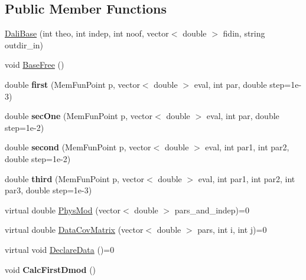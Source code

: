 \subsection*{Public Member Functions}
\begin{DoxyCompactItemize}
\item 
\hyperlink{classDaliBase_a7ea85e708de3877d9a771d93ea76d617}{Dali\-Base} (int theo, int indep, int noof, vector$<$ double $>$ fidin, string outdir\-\_\-in)
\item 
void \hyperlink{classDaliBase_af6a34db604769e09853e8300dc17fd7c}{Base\-Free} ()
\item 
\hypertarget{classDaliBase_a07d372be1ae30d25a7fd5444042585c4}{double {\bfseries first} (Mem\-Fun\-Point p, vector$<$ double $>$ eval, int par, double step=1e-\/3)}\label{classDaliBase_a07d372be1ae30d25a7fd5444042585c4}

\item 
\hypertarget{classDaliBase_a546624effef5b36ffc555ad13de1709b}{double {\bfseries sec\-One} (Mem\-Fun\-Point p, vector$<$ double $>$ eval, int par, double step=1e-\/2)}\label{classDaliBase_a546624effef5b36ffc555ad13de1709b}

\item 
\hypertarget{classDaliBase_a23a77b29f9d2d66f01327220ed1a9440}{double {\bfseries second} (Mem\-Fun\-Point p, vector$<$ double $>$ eval, int par1, int par2, double step=1e-\/2)}\label{classDaliBase_a23a77b29f9d2d66f01327220ed1a9440}

\item 
\hypertarget{classDaliBase_a1befad16dea2fdbd9e400e7a046f9b3f}{double {\bfseries third} (Mem\-Fun\-Point p, vector$<$ double $>$ eval, int par1, int par2, int par3, double step=1e-\/3)}\label{classDaliBase_a1befad16dea2fdbd9e400e7a046f9b3f}

\item 
virtual double \hyperlink{classDaliBase_ab19c9c960d914f5b8269237420deb8ca}{Phys\-Mod} (vector$<$ double $>$ pars\-\_\-and\-\_\-indep)=0
\item 
virtual double \hyperlink{classDaliBase_af8e98eb7184370d8d64b3b55bc395c6c}{Data\-Cov\-Matrix} (vector$<$ double $>$ pars, int i, int j)=0
\item 
virtual void \hyperlink{classDaliBase_ac0acf75f804718d75ba8ec375c342fad}{Declare\-Data} ()=0
\item 
\hypertarget{classDaliBase_a0c6137241ae1f7c543cd3b6694f5198f}{void {\bfseries Calc\-First\-Dmod} ()}\label{classDaliBase_a0c6137241ae1f7c543cd3b6694f5198f}


\end{DoxyCompactItemize}
